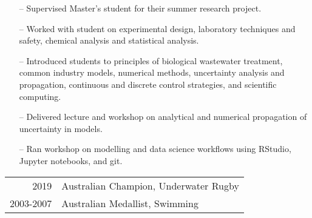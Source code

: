 \documentclass[10pt,a4paper]{altacv}
\begin{document}
\begin{itemize}
    \setlength{\itemindent}{0.5em}
    \item[--]   \small{Supervised Master's student for their summer research project.}
    \item[--]   \small{Worked with student on experimental design, laboratory techniques and safety, chemical analysis and statistical analysis.}
\end{itemize}
\divider\smallskip


\begin{itemize}
    \setlength{\itemindent}{0.5em}
    \item[--]   \small{Introduced students to principles of biological wastewater treatment, common industry models, numerical methods, uncertainty analysis and propagation, continuous and discrete control strategies, and scientific computing.}
\end{itemize}
\divider\smallskip

\begin{itemize}
    \setlength{\itemindent}{0.5em}
    \item[--]   \small{Delivered lecture and workshop on analytical and numerical propagation of uncertainty in models.}
    \item[--]   \small{Ran workshop on modelling and data science workflows using RStudio, Jupyter notebooks, and git.}
\end{itemize}




\begin{tabular}{rl}
2019 & Australian Champion, Underwater Rugby \\
2003-2007 & Australian Medallist, Swimming\\
\end{tabular}







\end{document}
